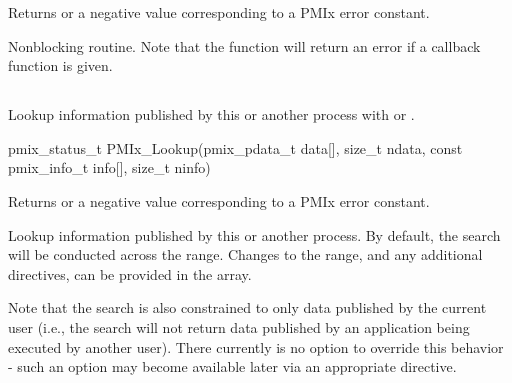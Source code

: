 \begin{arglist}
\end{arglist}

Returns  or a negative value corresponding to a PMIx error constant.

\descr

Nonblocking  routine.
Note that the function will return an error if a  callback function is given.


\subsection{}

\summary

Lookup information published by this or another process with  or .

\format

\cspecificstart
\begin{codepar}
pmix_status_t
PMIx_Lookup(pmix_pdata_t data[], size_t ndata,
            const pmix_info_t info[], size_t ninfo)
\end{codepar}
\cspecificend

\begin{arglist}
\end{arglist}

Returns  or a negative value corresponding to a PMIx error constant.

\descr

Lookup information published by this or another process.
By default, the search will be conducted across the  range.
Changes to the range, and any additional directives, can be provided in the  array.

Note that the search is also constrained to only data published by the current user (i.e., the search will not return data published by an application being executed by another user).
There currently is no option to override this behavior - such an option may become available later via an appropriate  directive.

